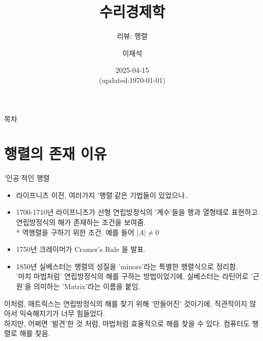 \documentclass[aspectratio=169]{beamer}
\title{수리경제학}
\subtitle{리뷰: 행렬}
\author{이재석}
\date{2025-04-15 \\ (updated:\today)}
\begin{document}
\begin{frame}
  \titlepage
\end{frame}

\begin{frame}{목차}
  \tableofcontents
\end{frame}


\section{행렬의 존재 이유}
\begin{frame}{'인공'적인 행렬}
  \begin{itemize}
    \item 라이프니츠 이전, 여러가지 '행렬'같은 기법들이 있었으나..
    \item 1700-1710년 라이프니츠가 선형 연립방정식의 '계수'들을 행과 열형태로 표현하고 연립방정식의 해가 존재하는 조건을 보여줌. \\ %
    * 역행렬을 구하기 위한 조건. 예를 들어 $ \left| A \right| \neq 0$
    \item 1750년 크레이머가 Cramer's Rule 을 발표.
    \item 1850년 실베스터는 행렬의 성질을 'minors'라는 특별한 행렬식으로 정리함. \\
      '마치 마법처럼' 연립방정식의 해를 구하는 방법이었기에, 실베스터는 라틴어로 '근원'을 의미하는 'Matrix'라는 이름을 붙임.
  \end{itemize}
  \vspace{10pt}
  이처럼, 매트릭스는 연립방정식의 해를 찾기 위해 '만들어진' 것이기에, 직관적이지 않아서 익숙해지기가 너무 힘들었다. \\
  하지만, 어쩌면 '발견'한 것 처럼, 마법처럼 효율적으로 해를 찾을 수 있다. 컴퓨터도 행렬로 해를 찾음.
\end{frame}
\end{document}
